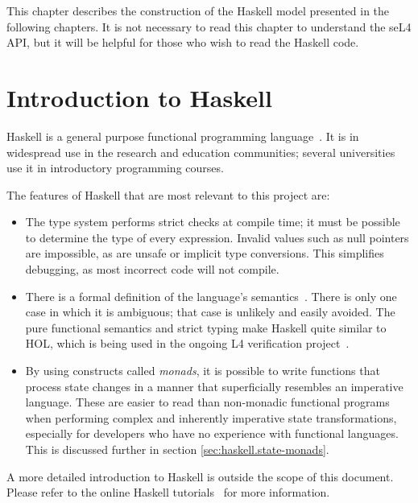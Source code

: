 %
%
%
%

This chapter describes the construction of the Haskell model presented in the following chapters. It is not necessary to read this chapter to understand the seL4 API, but it will be helpful for those who wish to read the Haskell code.

\section[intro]{Introduction to Haskell}

Haskell is a general purpose functional programming language~\cite{peytonjones03haskell}. It is in widespread use in the research and education communities; several universities use it in introductory programming courses.

The features of Haskell that are most relevant to this project are:
\begin{itemize}
\item The type system performs strict checks at compile time; it must be possible to determine the type of every expression. Invalid values such as null pointers are impossible, as are unsafe or implicit type conversions. This simplifies debugging, as most incorrect code will not compile.
\item There is a formal definition of the language's semantics~\cite{Fax:static}. There is only one case in which it is ambiguous; that case is unlikely and easily avoided. The pure functional semantics and strict typing make Haskell quite similar to HOL, which is being used in the ongoing L4 verification project~\cite{Tuch-KH-05}.
\item By using constructs called \emph{monads}, it is possible to write functions that process state changes in a manner that superficially resembles an imperative language. These are easier to read than non-monadic functional programs when performing complex and inherently imperative state transformations, especially for developers who have no experience with functional languages. This is discussed further in section \ref{sec:haskell.state-monads}.
\end{itemize}

A more detailed introduction to Haskell is outside the scope of this document. Please refer to the online Haskell tutorials~\cite{haskell-tutorial,monad-tutorial} for more information.

